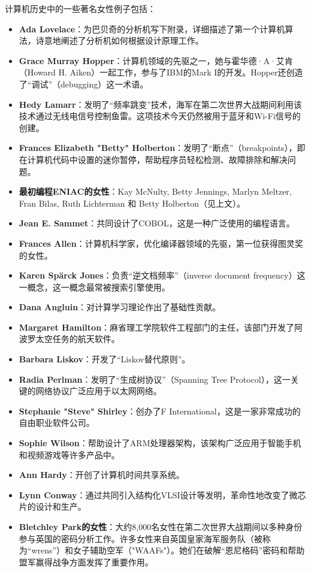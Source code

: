 计算机历史中的一些著名女性例子包括：
\begin{itemize}
\item \textbf{Ada Lovelace}：为巴贝奇的分析机写下附录，详细描述了第一个计算机算法，诗意地阐述了分析机如何根据设计原理工作。
\item \textbf{Grace Murray Hopper}：计算机领域的先驱之一，她与霍华德·A·艾肯（Howard H. Aiken）一起工作，参与了IBM的Mark I的开发。Hopper还创造了“调试”（debugging）这一术语。
\item \textbf{Hedy Lamarr}：发明了“频率跳变”技术，海军在第二次世界大战期间利用该技术通过无线电信号控制鱼雷。这项技术今天仍然被用于蓝牙和Wi-Fi信号的创建。
\item \textbf{Frances Elizabeth "Betty" Holberton}：发明了“断点”（breakpoints），即在计算机代码中设置的迷你暂停，帮助程序员轻松检测、故障排除和解决问题。
\item \textbf{最初编程ENIAC的女性}：Kay McNulty, Betty Jennings, Marlyn Meltzer, Fran Bilas, Ruth Lichterman 和 Betty Holberton（见上文）。
\item \textbf{Jean E. Sammet}：共同设计了COBOL，这是一种广泛使用的编程语言。
\item \textbf{Frances Allen}：计算机科学家，优化编译器领域的先驱，第一位获得图灵奖的女性。
\item \textbf{Karen Spärck Jones}：负责“逆文档频率”（inverse document frequency）这一概念，这一概念最常被搜索引擎使用。
\item \textbf{Dana Angluin}：对计算学习理论作出了基础性贡献。
\item \textbf{Margaret Hamilton}：麻省理工学院软件工程部门的主任，该部门开发了阿波罗太空任务的航天软件。
\item \textbf{Barbara Liskov}：开发了“Liskov替代原则”。
\item \textbf{Radia Perlman}：发明了“生成树协议”（Spanning Tree Protocol），这一关键的网络协议广泛应用于以太网网络。
\item \textbf{Stephanie "Steve" Shirley}：创办了F International，这是一家非常成功的自由职业软件公司。
\item \textbf{Sophie Wilson}：帮助设计了ARM处理器架构，该架构广泛应用于智能手机和视频游戏等许多产品中。
\item \textbf{Ann Hardy}：开创了计算机时间共享系统。
\item \textbf{Lynn Conway}：通过共同引入结构化VLSI设计等发明，革命性地改变了微芯片的设计和生产。
\item \textbf{Bletchley Park的女性}：大约8,000名女性在第二次世界大战期间以多种身份参与英国的密码分析工作。许多女性来自英国皇家海军服务队（被称为“wrens”）和女子辅助空军（"WAAFs"）。她们在破解“恩尼格码”密码和帮助盟军赢得战争方面发挥了重要作用。
\end{itemize}
